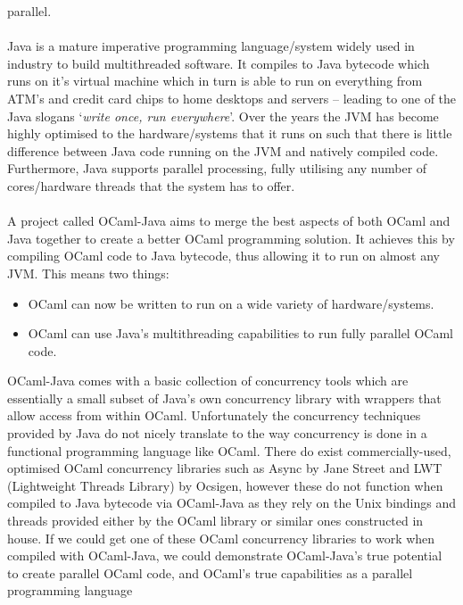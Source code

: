 \documentclass[12pt,twoside,notitlepage]{report}
\begin{document}
parallel.
\hfill\\
\hfill\\
%
%
Java is a mature imperative programming language/system widely used in industry to build multithreaded software\cite{web:matlab}. It compiles to Java bytecode which runs on it's virtual machine which in turn is able to run on
everything from ATM's and credit card chips to home desktops and servers -- leading to one of the Java slogans `{\em write once, run everywhere}'. Over the years the JVM has become highly optimised to the hardware/systems that it runs
on such that there is little difference between Java code running on the JVM and natively compiled code. Furthermore, Java supports parallel processing, fully utilising any number of cores/hardware threads that the system has to
offer.
\hfill\\
\hfill\\
%
%
A project called OCaml-Java aims to merge the best aspects of both OCaml and Java together to create a better OCaml programming solution. It achieves this by compiling OCaml code to Java bytecode, thus allowing it to run on
almost any JVM.
This means two things:
\begin{itemize}
\item OCaml can now be written to run on a wide variety of hardware/systems.
\item OCaml can use Java's multithreading capabilities to run fully parallel OCaml code\cite{clerc2012}.
\end{itemize}
OCaml-Java comes with a basic collection of concurrency tools which are essentially a small subset of Java's own concurrency library with wrappers that allow access from within OCaml. Unfortunately the concurrency techniques provided
by Java do not nicely translate to the way concurrency is done in a functional programming language like OCaml. There do exist commercially-used, optimised OCaml concurrency libraries such as Async by Jane Street and LWT (Lightweight
Threads Library) by Ocsigen, however these do not function when compiled to Java bytecode via OCaml-Java as they rely on the Unix bindings and threads provided either by the OCaml library or similar ones constructed in house.  If we
could get one of these OCaml concurrency libraries to work when compiled with OCaml-Java, we could demonstrate OCaml-Java's true potential to create parallel OCaml code, and OCaml's true capabilities as a parallel programming language
\end{document}
